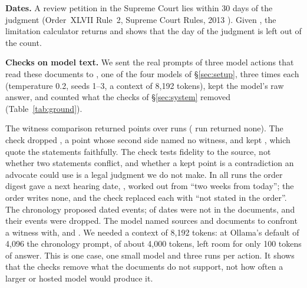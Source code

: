 \textbf{Dates.} A review petition in the Supreme Court lies within 30 days of the judgment (Order~XLVII Rule~2, Supreme Court Rules, 2013 \cite{scrules}). Given \CaseLimitStart, the limitation calculator returns \CaseLimitDate{} and shows that the day of the judgment is left out of the count.

\textbf{Checks on model text.} We sent the real prompts of three model actions that read these documents to \GroundModel{}, one of the four models of \S\ref{sec:setup}, three times each (temperature 0.2, seeds 1--3, a context of 8{,}192 tokens), kept the model's raw answer, and counted what the checks of \S\ref{sec:system} removed (Table~\ref{tab:ground}).

\begin{table}[t]
\caption{What the source checks removed from \GroundModel's answers on the worked case, \GroundRuns{} runs per action.}
\label{tab:ground}
\centering
\footnotesize
\setlength{\tabcolsep}{3pt}

\end{table}

The witness comparison returned \GroundMatrixProposed{} points over \GroundMatrixRuns{} runs (\GroundMatrixEmptyRuns{} run returned none). The check dropped \GroundMatrixDropped, a point whose second side named no witness, and kept \GroundMatrixKept, which quote the statements faithfully. The check tests fidelity to the source, not whether two statements conflict, and whether a kept point is a contradiction an advocate could use is a legal judgment we do not make. In all \GroundDigestRuns{} runs the order digest gave a next hearing date, \GroundDigestDates, worked out from ``two weeks from today''; the order writes none, and the check replaced each with ``not stated in the order''. The chronology proposed \GroundTimelineProposed{} dated events; \GroundIsoMissing{} of \GroundIsoProposed{} dates were not in the documents, and their events were dropped. The model named \GroundSourcesNamed{} sources and \GroundQDocsNamed{} documents to confront a witness with, and \GroundSuppliedClause. We needed a context of 8{,}192 tokens: at Ollama's default of 4{,}096 the chronology prompt, of about 4{,}000 tokens, left room for only 100 tokens of answer. This is one case, one small model and three runs per action. It shows that the checks remove what the documents do not support, not how often a larger or hosted model would produce it.
